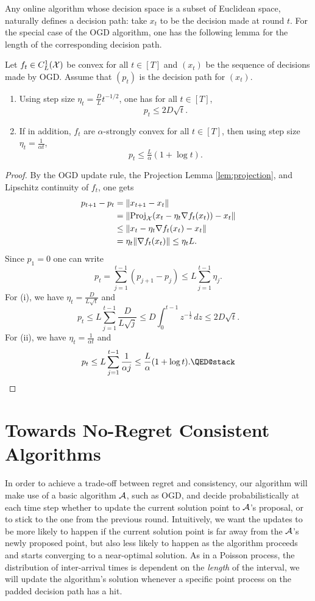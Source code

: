 Any online algorithm whose decision space is a subset of Euclidean space, naturally defines a decision path: take $x_t$ to be the decision made at round $t$. For the special case of the OGD algorithm, one has the following lemma for the length of the corresponding decision path. 
\begin{lemma}
  Let $f_t\in C^1_L(\mathcal{X})$ be convex for all $t\in[T]$ and $(x_t)$ be the sequence of decisions made by OGD. Assume that $(p_t)$ is the decision path for $(x_t)$.
  \begin{enumerate}[label=(\roman*)]
      \item Using step size $\eta_t = \frac{D}{L}t^{-1/2}$, one has for all $t \in [T]$,
         \[ p_t \leq  2D \sqrt{t}. \]
     \item If in addition, $f_t$ are $\alpha$-strongly convex for all $t\in [T]$, then using step size $\eta_t=\frac{1}{\alpha t}$,
         \[ p_t \leq \tfrac{L}{\alpha}(1+\log t). \]
  \end{enumerate}
  \label{lem:ogdpathlength}
\end{lemma}
\begin{proof}
    By the OGD update rule, the Projection Lemma \ref{lem:projection}, and Lipschitz continuity of $f_t$, one gets
 \begin{align*}
   p_{t+1}-p_t &= \|x_{t+1} - x_t\| \\
   &= \|\mathrm{Proj}_{\mathcal{X}}(x_t - \eta_t\nabla f_t(x_t))-x_t\| \\
  &\leq \|x_t - \eta_t\nabla f_t(x_t)-x_t\| \\
  &= \eta_t\|\nabla f_t(x_t)\| \leq \eta_t L.
 \end{align*}
Since $p_1 = 0$ one can write
\[
  p_t = \sum_{j=1}^{t-1} (p_{j+1} - p_j) \leq L\sum_{j=1}^{t-1} \eta_j.
\]
For (i), we have $\eta_t = \frac{D}{L\sqrt{t}}$ and
   \[
   p_t \leq L\sum_{j=1}^{t-1} \frac{D}{L\sqrt{j}} \leq D \int_0^{t-1} z^{-\frac{1}{2}}\,dz \leq 2D\sqrt{t}.
 \]
For (ii), we have $\eta_t = \frac{1}{\alpha t}$ and
  \[
    p_t \leq L \sum_{j=1}^{t-1} \frac{1}{\alpha j} \leq \frac{L}{\alpha}(1+\log t). \qedhere
 \]
\end{proof}

\section{Towards No-Regret Consistent Algorithms}\label{sec:towardsolo}

In order to achieve a trade-off between regret and consistency, our algorithm will make use of a basic algorithm $\mathcal{A}$, such as OGD, and decide probabilistically at each time step whether to update the current solution point to $\mathcal{A}$'s proposal, or to stick to the one from the previous round. Intuitively, we want the updates to be more likely to happen if the current solution point is far away from the $\mathcal{A}$'s newly proposed point, but also less likely to happen as the algorithm proceeds and starts converging to a near-optimal solution. As in a Poisson process, the distribution of inter-arrival times is dependent on the \emph{length} of the interval, we will update the algorithm's solution whenever a specific point process on the padded decision path has a hit. 

